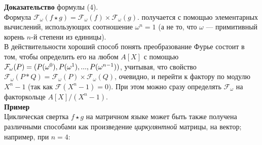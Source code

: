 \documentclass{mai_book}
\begin{document}
\textbf{Доказательство}  формулы (4).\\
Формула $\mathcal{F}_{\omega} (f \star g) = \mathcal{F}_{\omega} (f) \times \mathcal{F}_{\omega} (g).$ получается с помощью 
элементарных вычислений, использующих соотношение $\omega^n = 1$ (а не то,
что $\omega$ — примитивный корень $n$-й степени из единицы).\\
В действительности хороший способ понять преобразование 
Фурье состоит в том, чтобы определить его на любом $A[X]$ с 
помощью $\mathcal{F}_{\omega} (P) = (P(\omega^0),P(\omega^1),...,\\P({\omega}^{n-1}))$, учитывая, что свойство
$\mathcal{F}_{\omega} (P \ast Q) = \mathcal{F}_{\omega} (P) \times \mathcal{F}_{\omega} (Q)$, очевидно, и перейти к фактору по
модулю $X^n - 1$ (так как $\mathcal{F} (X^n - 1) = 0)$. При этом можно сразу
определять $\mathcal{F}_{\omega}$ на факторкольце $A[X]/(X^n - 1)$.\smallskip\\
\textbf{Пример}\smallskip\\
Циклическая свертка $f \star g$ на матричном языке может быть 
также получена различными способами как произведение \textit{циркулянтной}
матрицы, на вектор; например, при $ n = 4$:\\
\end{document}
